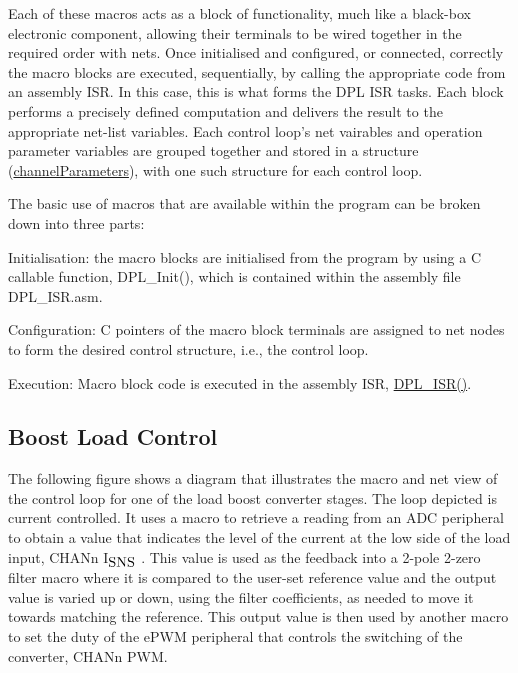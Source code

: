 Each of these macros acts as a block of functionality, much like a black-\/box electronic component, allowing their terminals to be wired together in the required order with nets. Once initialised and configured, or connected, correctly the macro blocks are executed, sequentially, by calling the appropriate code from an assembly I\-S\-R. In this case, this is what forms the D\-P\-L I\-S\-R tasks. Each block performs a precisely defined computation and delivers the result to the appropriate net-\/list variables. Each control loop's net vairables and operation parameter variables are grouped together and stored in a structure (\hyperlink{structchannel_parameters}{channel\-Parameters}), with one such structure for each control loop.

The basic use of macros that are available within the program can be broken down into three parts\-:
\begin{DoxyEnumerate}
\item Initialisation\-: the macro blocks are initialised from the program by using a C callable function, D\-P\-L\-\_\-\-Init(), which is contained within the assembly file D\-P\-L\-\_\-\-I\-S\-R.\-asm.
\item Configuration\-: C pointers of the macro block terminals are assigned to net nodes to form the desired control structure, i.\-e., the control loop.
\item Execution\-: Macro block code is executed in the assembly I\-S\-R, \hyperlink{_pwm_8h_a5532a53363218854b0e4b15049d773f7}{D\-P\-L\-\_\-\-I\-S\-R()}.
\end{DoxyEnumerate}\hypertarget{index_blctrl}{}\subsection{Boost Load Control}\label{index_blctrl}
The following figure shows a diagram that illustrates the macro and net view of the control loop for one of the load boost converter stages. The loop depicted is current controlled. It uses a macro to retrieve a reading from an A\-D\-C peripheral to obtain a value that indicates the level of the current at the low side of the load input, C\-H\-A\-Nn I$_{\mbox{S\-N\-S}}$ . This value is used as the feedback into a 2-\/pole 2-\/zero filter macro where it is compared to the user-\/set reference value and the output value is varied up or down, using the filter coefficients, as needed to move it towards matching the reference. This output value is then used by another macro to set the duty of the e\-P\-W\-M peripheral that controls the switching of the converter, C\-H\-A\-Nn P\-W\-M.

